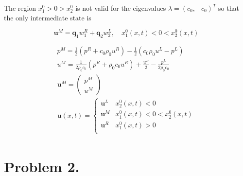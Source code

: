 \documentclass[
  11pt,
]{article}
\begin{document}
The region \(x_1^0 > 0 > x_2^0\) is not valid for the eigenvalues
\(\lambda = (c_0, -c_0)^T\) so that the only intermediate state is

\[
\mathbf{u}^M = \mathbf{q}_1w_1^R + \mathbf{q}_2 w_2^L , \quad x^0_1(x,t)< 0 < x^0_2(x,t)
\]

\[
\boxed{
\begin{gathered}
p^M =  \frac{1}{2}\left(p^R+c_0 \rho_0 u^R\right) -\frac{1}{2} \left(c_0\rho_0 u^L - p^L\right) \\
u^M = \frac{1}{2\rho_0 c_0} \left(p^R + \rho_0 c_0 u^R\right) + \frac{u^R}{2} - \frac{p^L}{2 \rho_0 c_0}  \\
\mathbf{u}^M = \begin{pmatrix} p^M \\ u^M\end{pmatrix} \\
\mathbf{u}(x,t)= 
 \left\{\begin{array}{cc} 
 \mathbf{u}^L & x^0_2(x,t)<0\\
 \mathbf{u}^M & x^0_1(x,t)< 0 < x^0_2(x,t)\\
 \mathbf{u}^R & x^0_1(x,t)>0\\
 \end{array} \right.\\
\end{gathered}}
\]

\newpage{}

\hypertarget{problem-2.}{%
\section{Problem 2.}\label{problem-2.}}
\end{document}
